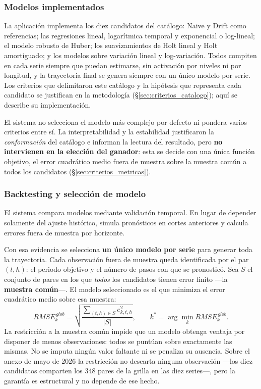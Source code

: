 \documentclass[12pt,letterpaper]{article}
\begin{document}
\subsubsection{Modelos implementados}

La aplicación implementa los diez candidatos del catálogo: Naive y Drift como referencias; las regresiones lineal, logarítmica temporal y exponencial o log-lineal; el modelo robusto de Huber; los suavizamientos de Holt lineal y Holt amortiguado; y los modelos sobre variación lineal y log-variación. Todos compiten en cada serie siempre que puedan estimarse, sin activación por niveles ni por longitud, y la trayectoria final se genera siempre con un único modelo por serie. Los criterios que delimitaron este catálogo y la hipótesis que representa cada candidato se justifican en la metodología (§\ref{sec:criterios_catalogo}); aquí se describe su implementación.

El sistema no selecciona el modelo más complejo por defecto ni pondera varios criterios entre sí. La interpretabilidad y la estabilidad justificaron la \emph{conformación} del catálogo e informan la lectura del resultado, pero \textbf{no intervienen en la elección del ganador}: esta se decide con una única función objetivo, el error cuadrático medio fuera de muestra sobre la muestra común a todos los candidatos (§\ref{sec:criterios_metricas}).

\subsubsection{Backtesting y selección de modelo}

El sistema compara modelos mediante validación temporal. En lugar de depender solamente del ajuste histórico, simula pronósticos en cortes anteriores y calcula errores fuera de muestra por horizonte.

Con esa evidencia se selecciona \textbf{un único modelo por serie} para generar toda la trayectoria. Cada observación fuera de muestra queda identificada por el par \((t,h)\): el periodo objetivo y el número de pasos con que se pronosticó. Sea \(S\) el conjunto de pares en los que \emph{todos} los candidatos tienen error finito ---la \textbf{muestra común}---. El modelo seleccionado es el que minimiza el error cuadrático medio sobre esa muestra:
\begin{equation}
RMSE_{k}^{\,glob}=\sqrt{\frac{\sum_{(t,h)\in S} e_{k,t,h}^{2}}{|S|}},
\qquad k^{*}=\arg\min_k RMSE_{k}^{\,glob}.
\end{equation}
La restricción a la muestra común impide que un modelo obtenga ventaja por disponer de menos observaciones: todos se puntúan sobre exactamente las mismas. No se imputa ningún valor faltante ni se penaliza su ausencia. Sobre el anexo de mayo de 2026 la restricción no descarta ninguna observación ---los diez candidatos comparten los 348 pares de la grilla en las diez series---, pero la garantía es estructural y no depende de ese hecho.
\end{document}
